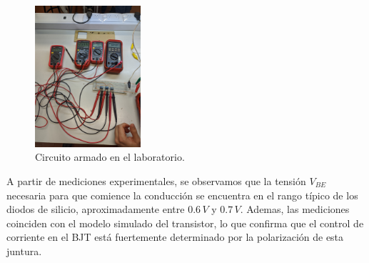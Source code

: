     \begin{figure}
      \centering
      \includegraphics[width=0.35\textwidth]{pictures/setup_crkt-1.jpg}
      \caption{Circuito armado en el laboratorio.}
    \end{figure}
    A partir de mediciones experimentales, se observamos que la tensión $V_{BE}$ necesaria para que comience la
    conducción se encuentra en el rango típico de los diodos de silicio, aproximadamente entre $0.6\,V$ y $0.7\,V$.
    Ademas, las mediciones coinciden con el modelo simulado del transistor, lo que confirma que el control de corriente
    en el BJT está fuertemente determinado por la polarización de esta juntura.
